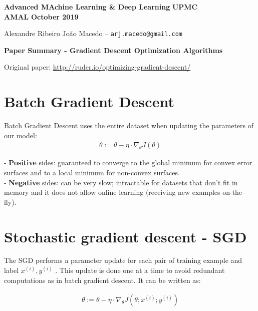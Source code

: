 \documentclass[10pt]{article} %
\theoremstyle{question-style}
\begin{document}
\date{August 2018}
\noindent
\normalsize\textbf{Advanced MAchine Learning \& Deep Learning} \hfill \textbf{UPMC}\\
\normalsize\textbf{AMAL} \hfill \textbf{October 2019}

{\small Alexandre Ribeiro João Macedo --  \texttt{arj.macedo@gmail.com}}\vspace{20pt}
\centerline{\Large \textbf{Paper Summary - Gradient Descent Optimization Algorithms}}
\vspace{10pt}

\begin{flushleft}

Original paper: \href{http://ruder.io/optimizing-gradient-descent/}{http://ruder.io/optimizing-gradient-descent/}

\section{Batch Gradient Descent}

Batch Gradient Descent uses the entire dataset when updating the parameters of our model:
\begin{align*}
    \theta := \theta - \eta \cdot \nabla_{\theta}J(\theta)    
\end{align*}

- \textbf{Positive} sides: guaranteed to converge to the global minimum for convex error surfaces and to a local minimum for non-convex surfaces. \\

- \textbf{Negative} sides: can be very slow; intractable for datasets that don't fit in memory and it does not allow online learning (receiving new examples on-the-fly).


\section{Stochastic gradient descent - SGD}
The SGD performs a parameter update for each pair of training example and label $x^{(i)},y^{(i)} $ . This update is done one at a time to avoid redundant computations as in batch gradient descent. It can be written as:

\begin{align*}
    \theta := \theta - \eta \cdot \nabla_{\theta} J \left( \theta; x^{(i)};y^{(i)} \right)
\end{align*}


\end{flushleft}
\end{document}
